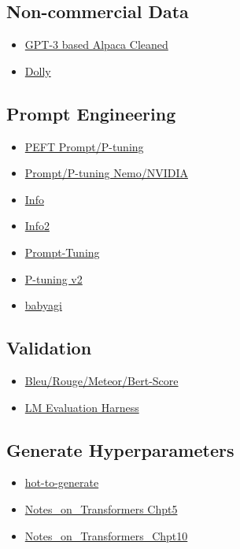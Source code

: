 \documentclass{article}
\begin{document}
\subsection*{Non-commercial Data}
\begin{itemize}
    \item \href{https://github.com/gururise/AlpacaDataCleaned}{GPT-3 based Alpaca Cleaned}
    \item \href{https://github.com/databrickslabs/dolly/tree/master}{Dolly}
\end{itemize}

\subsection*{Prompt Engineering}
\begin{itemize}
    \item \href{https://github.com/huggingface/peft}{PEFT Prompt/P-tuning}
    \item \href{https://docs.nvidia.com/deeplearning/nemo/user-guide/docs/en/main/nlp/nemo_megatron/prompt_learning.html}{Prompt/P-tuning Nemo/NVIDIA}
    \item \href{https://lilianweng.github.io/posts/2023-03-15-prompt-engineering/}{Info}
    \item \href{https://github.com/dair-ai/Prompt-Engineering-Guide}{Info2}
    \item \href{https://arxiv.org/abs/2104.08691}{Prompt-Tuning}
    \item \href{https://arxiv.org/abs/2110.07602}{P-tuning v2}
    \item \href{https://github.com/yoheinakajima/babyagi/blob/main/babyagi.py#L97-L134}{babyagi}
\end{itemize}

\subsection*{Validation}
\begin{itemize}
    \item \href{https://arize.com/blog-course/generative-ai-metrics-bleu-score/}{Bleu/Rouge/Meteor/Bert-Score}
    \item \href{https://github.com/EleutherAI/lm-evaluation-harness}{LM Evaluation Harness}
\end{itemize}

\subsection*{Generate Hyperparameters}
\begin{itemize}
    \item \href{https://huggingface.co/blog/how-to-generate}{hot-to-generate}
    \item \href{https://christianjmills.com/posts/transformers-book-notes/chapter-5/index.html}{Notes\_on\_Transformers Chpt5}
    \item \href{https://christianjmills.com/posts/transformers-book-notes/chapter-10/index.html}{Notes\_on\_Transformers\_Chpt10}
\end{itemize}
\end{document}
